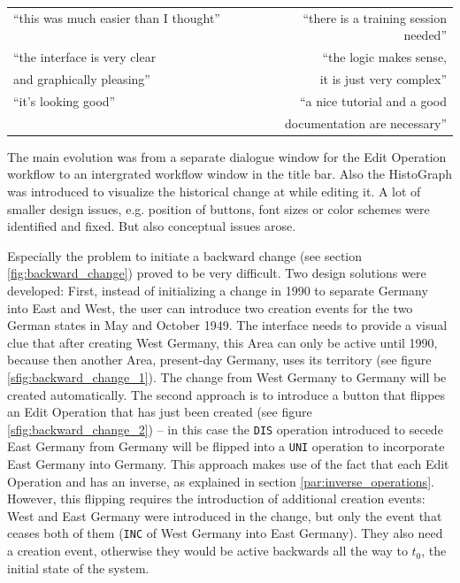 \begin{quoteit}
  \begin{tabular}{l r}
    ``this was much easier than I thought'' ~~~~~~~~ &
    ``there is a training session needed'' \\[0.5em]
    ``the interface is very clear &
    ``the logic makes sense, \\
    and graphically pleasing'' &
    it is just very complex'' \\[0.5em]
    ``it's looking good'' &
    ``a nice tutorial and a good \\
    & documentation are necessary'' \\
  \end{tabular}
\end{quoteit}

The main evolution was from a separate dialogue window for the Edit Operation workflow to an intergrated workflow window in the title bar. Also the HistoGraph was introduced to visualize the historical change at while editing it. A lot of smaller design issues, e.g. position of buttons, font sizes or color schemes were identified and fixed. But also conceptual issues arose.

Especially the problem to initiate a backward change (see section \ref{fig:backward_change}) proved to be very difficult. Two design solutions were developed: First, instead of initializing a change in 1990 to separate Germany into East and West, the user can introduce two creation events for the two German states in May and October 1949. The interface needs to provide a visual clue that after creating West Germany, this Area can only be active until 1990, because then another Area, present-day Germany, uses its territory (see figure \ref{sfig:backward_change_1}). The change from West Germany to Germany will be created automatically. The second approach is to introduce a button that flippes an Edit Operation that has just been created (see figure \ref{sfig:backward_change_2}) -- in this case the \texttt{DIS} operation introduced to secede East Germany from Germany will be flipped into a \texttt{UNI} operation to incorporate East Germany into Germany. This approach makes use of the fact that each Edit Operation and has an inverse, as explained in section \ref{par:inverse_operations}.
However, this flipping requires the introduction of additional creation events: West and East Germany were introduced in the change, but only the event that ceases both of them (\texttt{INC} of West Germany into East Germany). They also need a creation event, otherwise they would be active backwards all the way to $t_0$, the initial state of the system.

